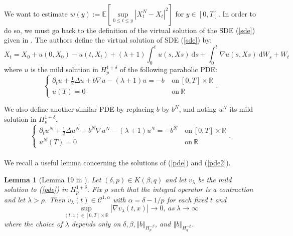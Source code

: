 \documentclass{article}[12pt]
\newtheorem{lem}[theo]{Lemma}
\newcommand{\norme}[1]{\left\Vert #1\right\Vert}
\newcommand{\R}{\mathbb{R}}
\newcommand{\E}{\mathbb{E}}
\newcommand{\di}{\mathrm{d}}
\begin{document}
        \paragraph{}
        We want to estimate $w(y):=\E\left[\underset{0\leq t\leq y}{\sup}\left|X^{N}_t-X_t\right|^2\right]$ for $y\in[0,T]$. In order to do so, we must go back to the definition of the virtual solution of the SDE (\ref{sde}) given in \cite{Fla-Iss-Rus-2017}. The authors define the virtual solution of SDE (\ref{sde}) by:
        \begin{equation}
        X_t = X_0 + u(0,X_0) - u(t,X_t) + (\lambda+1)\int_0^t u(s,Xs)\ \di s +\int_0^t \nabla u(s,Xs)\ \di W_s + W_t
        \end{equation}
        where $u$ is the mild solution in $H_p^{1+\delta}$ of the following parabolic PDE:
        \begin{equation}\label{pde}
        \begin{cases}
        \partial_t u + \frac{1}{2}\Delta u + b\nabla u - (\lambda+1)u = -b\ &\mathrm{on}\ [0,T]\times\R\\
        u(T) = 0\ &\mathrm{on}\ \R
        \end{cases}.
        \end{equation}
        
        We also define another similar PDE by replacing $b$ by $b^N$, and noting $u^N$ its mild solution in $H_p^{1+\delta}$.
        \begin{equation}\label{pde2}
        \begin{cases}
        \partial_t u^N + \frac{1}{2}\Delta u^N + b^N\nabla u^N - (\lambda+1)u^N = -b^N\ &\mathrm{on}\ [0,T]\times\R\\
        u^N(T) = 0\ &\mathrm{on}\ \R
        \end{cases}.
        \end{equation}
        
        \paragraph{}              
        We recall a useful lemma concerning the solutions of (\ref{pde}) and (\ref{pde2}).
        
        \begin{lem}[Lemma 19 in \cite{Fla-Iss-Rus-2017}]\label{lem}
            Let $(\delta,p)\in K(\beta,q)$ and let $v_\lambda$ be the mild solution to (\ref{pde}) in $H_p^{1+\delta}$. Fix $\rho$ such that the integral operator is a contraction and let $\lambda>\rho$. Then $v_\lambda(t)\in\mathcal{C}^{1,\alpha}$ with $\alpha=\delta-1/p$ for each fixed $t$ and 
            \begin{equation}
            \underset{(t,x)\in[0,T]\times\R}{\sup} |\nabla v_\lambda(t,x)| \rightarrow 0,\ as\ \lambda \rightarrow \infty
            \end{equation}
            where the choice of $\lambda$ depends only on $\delta,\beta,\norme{b}_{H_p^{-\beta}}$, and $\norme{b}_{H_q^{-\beta}}$.
        \end{lem}
        
\end{document}

